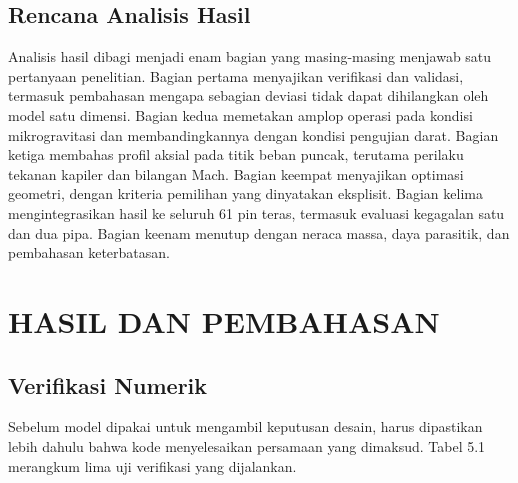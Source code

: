 \documentclass[
  indonesian,
  12pt,
  a4paper,
]{report}
\begin{document}
\section{Rencana Analisis Hasil}\label{rencana-analisis-hasil}

Analisis hasil dibagi menjadi enam bagian yang masing-masing menjawab
satu pertanyaan penelitian. Bagian pertama menyajikan verifikasi dan
validasi, termasuk pembahasan mengapa sebagian deviasi tidak dapat
dihilangkan oleh model satu dimensi. Bagian kedua memetakan amplop
operasi pada kondisi mikrogravitasi dan membandingkannya dengan kondisi
pengujian darat. Bagian ketiga membahas profil aksial pada titik beban
puncak, terutama perilaku tekanan kapiler dan bilangan Mach. Bagian
keempat menyajikan optimasi geometri, dengan kriteria pemilihan yang
dinyatakan eksplisit. Bagian kelima mengintegrasikan hasil ke seluruh 61
pin teras, termasuk evaluasi kegagalan satu dan dua pipa. Bagian keenam
menutup dengan neraca massa, daya parasitik, dan pembahasan
keterbatasan.

\chapter{HASIL DAN PEMBAHASAN}\label{hasil-dan-pembahasan}

\section{Verifikasi Numerik}\label{verifikasi-numerik-1}

Sebelum model dipakai untuk mengambil keputusan desain, harus dipastikan
lebih dahulu bahwa kode menyelesaikan persamaan yang dimaksud. Tabel 5.1
merangkum lima uji verifikasi yang dijalankan.
\end{document}
